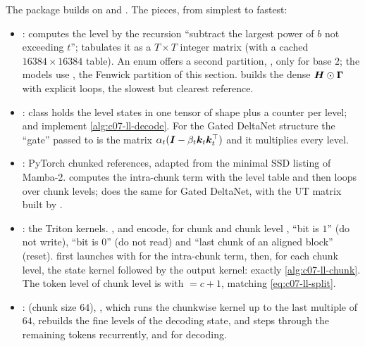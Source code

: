 \begin{implnote}[title={In the code: the official repository \texttt{HanGuo97/log-linear-attention}}]
The package  builds on \fla{} and
. The pieces, from simplest to fastest:
\begin{itemize}
\item {}:  computes the level by the
  recursion ``subtract the largest power of $b$ not exceeding $t$''; 
  tabulates it as a $T\times T$ integer matrix (with a cached $16384\times16384$ table). An
  enum  offers a second partition, , only for base $2$; the models use
  , the Fenwick partition of this section.  builds the
  dense $\bm{H}\odot\bm{\Gamma}$ with explicit loops, the slowest but clearest reference.
\item {}: class  holds the level states in one
  tensor of shape  plus a counter per level;
   and  implement \cref{alg:c07-ll-decode}. For the
  Gated DeltaNet structure the ``gate'' passed to  is the matrix
  $\alpha_t(\bm{I}-\beta_t\bm{k}_t\bm{k}_t^{\top})$ and it multiplies every level.
\item {}: PyTorch chunked references, adapted from the
  minimal SSD listing of Mamba-2.  computes the intra-chunk term
  with the level table and then loops over chunk levels;  does the same
  for Gated DeltaNet, with the UT matrix built by .
\item {}: the Triton kernels. ,  and
   encode, for chunk  and chunk level , ``bit  is $1$''
  (do not write), ``bit  is $0$'' (do not read) and ``last chunk of an aligned block''
  (reset).  first launches  with
   for the intra-chunk term, then, for each chunk level, the state kernel
   followed by the output kernel: exactly \cref{alg:c07-ll-chunk}.
  The token level of chunk level  is  with
   $= c+1$, matching \cref{eq:c07-ll-split}.
\item {}:  (chunk size $64$),
  , which runs the chunkwise kernel up to the last multiple of $64$,
  rebuilds the fine levels of the decoding state, and steps through the remaining tokens
  recurrently, and  for decoding.
\end{itemize}
\end{implnote}

